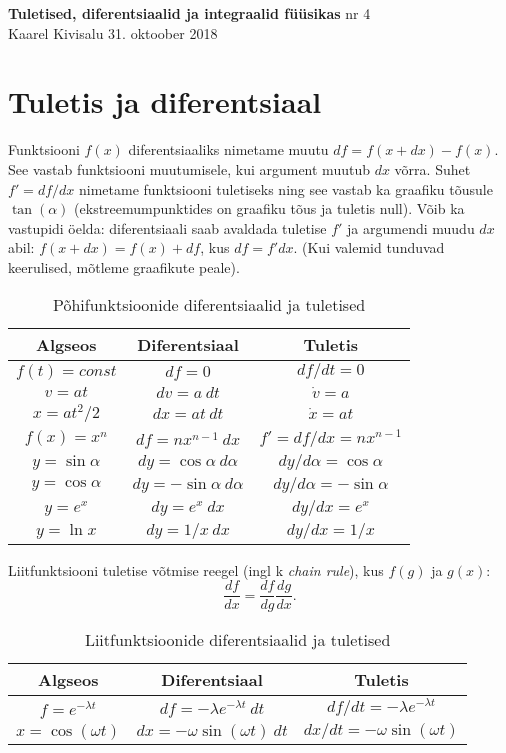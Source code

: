 \documentclass[a4paper,11pt,twocolumn]{article}
\begin{document}
{\huge \textbf{Tuletised, diferentsiaalid ja integraalid füüsikas} \hfill \normalsize {nr 4}} \\
{Kaarel Kivisalu \hfill 31. oktoober 2018}

\section{Tuletis ja diferentsiaal}
Funktsiooni \( f(x) \) diferentsiaaliks nimetame muutu \( df = f(x + dx) − f(x) \). See vastab funktsiooni muutumisele, kui argument muutub \( dx \) võrra. Suhet \( f' = df /dx \) nimetame funktsiooni tuletiseks ning see vastab ka graafiku tõusule \( \tan(\alpha) \) (ekstreemumpunktides on graafiku tõus ja tuletis null). Võib ka vastupidi öelda: diferentsiaali saab avaldada tuletise \( f' \) ja argumendi muudu \( dx \) abil: \( f(x + dx) = f(x) + df \), kus \( df = f'dx \). (Kui valemid tunduvad keerulised, mõtleme graafikute peale).

\begin{table}[h]
	\centering
	\caption{Põhifunktsioonide diferentsiaalid ja tuletised}
	\begin{tabular}{ c | c | c }
		\hline \hline
		Algseos & Diferentsiaal & Tuletis \\
		\hline
		\( f(t)=const \) & \( df=0 \) & \( df/dt=0 \) \\
		\( v=at \) & \( dv=a\ dt \) & \( \dot{v}=a \) \\
		\( x=at^2/2 \) & \( dx=at\ dt \) & \( \dot{x}=at \) \\
		\( f(x)=x^n \) & \( df=nx^{n-1}\ dx \) & \( f'=df/dx=nx^{n-1} \) \\
		\( y=\sin \alpha \) & \( dy=\cos \alpha\ d\alpha \) & \( dy/d\alpha=\cos \alpha \) \\
		\( y=\cos \alpha \) & \( dy=-\sin \alpha\ d\alpha \) & \( dy/d\alpha=-\sin \alpha  \) \\
		\( y=e^x \) & \( dy=e^x\ dx \) & \( dy/dx=e^x \) \\
		\( y=\ln x \) & \( dy=1/x\ dx \) & \( dy/dx=1/x \) \\
	\end{tabular}
\end{table}

Liitfunktsiooni tuletise võtmise reegel (ingl k \textit{chain rule}), kus \( f(g) \) ja \( g(x) \):
\[ \frac{df}{dx}=\frac{df}{dg}\frac{dg}{dx} \textrm{.}\]

\begin{table}[h!]
	\centering
	\caption{Liitfunktsioonide diferentsiaalid ja tuletised}
	\begin{tabular}{ c | c | c }
		\hline \hline
		Algseos & Diferentsiaal & Tuletis \\
		\hline
		\( f=e^{-\lambda t} \) & \( df=-\lambda e^{-\lambda t}\ dt \) & \( df/dt=-\lambda e^{-\lambda t} \) \\
		\( x=\cos (\omega t) \) & \( dx=-\omega\sin (\omega t)\ dt\) & \( dx/dt=-\omega\sin (\omega t) \) \\
	\end{tabular}
\end{table}
\end{document}
